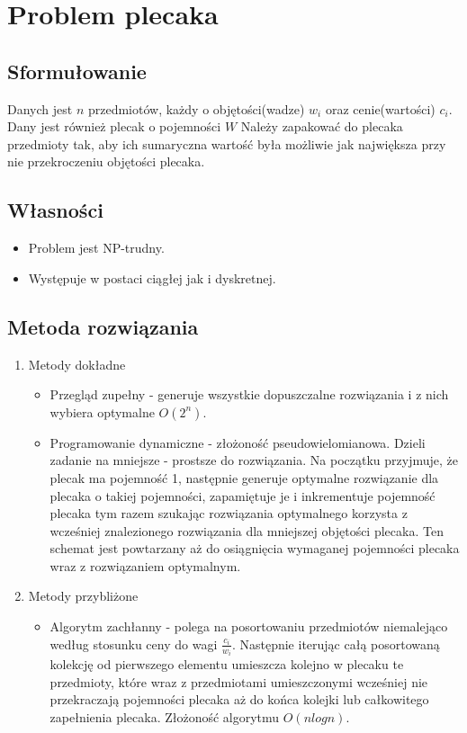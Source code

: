 \section{Problem plecaka}

	\subsection{Sformułowanie}
		Danych jest $n$ przedmiotów, każdy o objętości(wadze) $w_i$ oraz cenie(wartości) $c_i$.
		Dany jest również plecak o pojemności $W$
		Należy zapakować do plecaka przedmioty tak, aby ich sumaryczna wartość była możliwie jak największa przy
		nie przekroczeniu objętości plecaka.
		
	\subsection{Własności}
		\begin{itemize}
			\item Problem jest NP-trudny.
			\item Występuje w postaci ciągłej jak i dyskretnej.
		\end{itemize}
	\subsection{Metoda rozwiązania}
		\begin{enumerate}
			\item Metody dokładne
			\begin{itemize}
				\item Przegląd zupełny - generuje wszystkie dopuszczalne rozwiązania i z nich wybiera optymalne $O(2^n)$.
				\item Programowanie dynamiczne - złożoność pseudowielomianowa. Dzieli zadanie na mniejsze - prostsze do 
				rozwiązania. Na początku przyjmuje, że plecak ma pojemność 1, następnie generuje optymalne rozwiązanie
				dla plecaka o takiej pojemności, zapamiętuje je i inkrementuje pojemność plecaka tym razem szukając 
				rozwiązania optymalnego korzysta z wcześniej znalezionego rozwiązania dla mniejszej objętości plecaka.
				Ten schemat jest powtarzany aż do osiągnięcia wymaganej pojemności plecaka wraz z rozwiązaniem optymalnym.
			\end{itemize}
			\item Metody przybliżone
			\begin{itemize}
				\item Algorytm zachłanny - polega na posortowaniu przedmiotów niemalejąco według stosunku ceny do wagi 
				$\frac{c_i}{w_i}$. Następnie iterując całą posortowaną kolekcję od pierwszego elementu
				 umieszcza kolejno w plecaku te przedmioty, które wraz z przedmiotami umieszczonymi wcześniej nie 
				 przekraczają pojemności plecaka aż do końca kolejki lub całkowitego zapełnienia plecaka. 
				 Złożoność algorytmu $O(n logn)$.
			\end{itemize}
		\end{enumerate}
